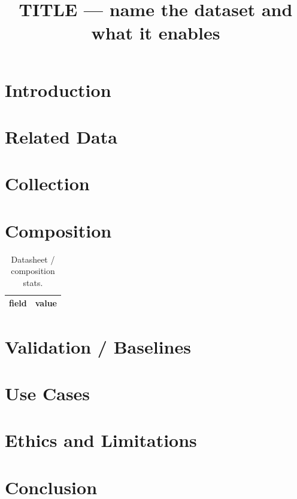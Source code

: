 \documentclass[sigconf,review,anonymous]{acmart}
\begin{document}
\title{TITLE — name the dataset and what it enables}
\begin{abstract}\end{abstract}
\maketitle
\section{Introduction}        %
\section{Related Data}
\section{Collection}          %
\section{Composition}
\begin{table}[t]\centering\caption{Datasheet / composition stats.}
\begin{tabular}{ll}\toprule field & value\\\bottomrule\end{tabular}\end{table}
\section{Validation / Baselines}
\section{Use Cases}
\section{Ethics and Limitations}
\section{Conclusion}

\end{document}
